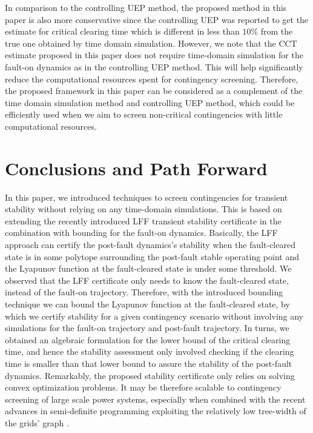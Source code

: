 \documentclass[final]{IEEEtran}
\begin{document}
In comparison to the controlling UEP method, the proposed method
in this paper is also more conservative since the controlling UEP
was reported \cite{Chiang:2011eo} to get the estimate for critical
clearing time which is different in less than $10\%$ from the true
one obtained by time domain simulation. However, we note that the
CCT estimate proposed in this paper does not require time-domain
simulation for the fault-on dynamics as in the controlling UEP
method. This will help significantly reduce the computational
resources spent for contingency screening. Therefore, the proposed
framework in this paper can be considered as a complement of the
time domain simulation method and controlling UEP method, which
could be efficiently used when we aim to screen non-critical
contingencies with little computational resources.


\section{Conclusions and Path Forward}
\label{sec:discussion}

In this paper, we introduced techniques to screen contingencies
for transient stability without relying on any time-domain
simulations. This is based on extending the recently introduced
LFF transient stability certificate in the combination with
bounding for the fault-on dynamics. Basically, the LFF approach
can certify the post-fault dynamics's stability when the
fault-cleared state is in some polytope surrounding the post-fault
stable operating point and the Lyapunov function at the
fault-cleared state is under some threshold. We observed that the
LFF certificate only needs to know the fault-cleared state,
instead of the fault-on trajectory. Therefore, with the introduced
bounding technique we can bound the Lyapunov function at the
fault-cleared state, by which we certify stability for a given
contingency scenario without involving any simulations for the
fault-on trajectory and post-fault trajectory. In turns, we
obtained an algebraic formulation for the lower bound of the
critical clearing time, and hence the stability assessment only
involved checking if the clearing time is smaller than that lower
bound to assure the stability of the post-fault dynamics.
Remarkably, the proposed stability certificate only relies on
solving convex optimization problems. It may be therefore scalable
to contingency screening of large scale power systems, especially
when combined with the recent advances in semi-definite
programming exploiting the relatively low tree-width of the grids'
graph \cite{Javadmadani2014sdp}.
\end{document}

